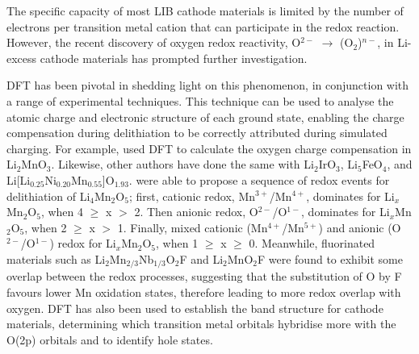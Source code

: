 \documentclass[../main.tex]{subfiles}
\begin{document}
The specific capacity of most LIB cathode materials is limited by the number of electrons per transition metal cation that can participate in the redox reaction. However, the recent discovery of oxygen redox reactivity, O$^{2-}$ $\to$ (O$_2$)$^{n-}$,  in Li-excess cathode materials\cite{Koga2013, Sathiya2013, Oishi2015, Sathiya2015, McCalla2015, Cao2015, Shimoda2016, Chen2016, Luo2016a, Hy2016, Muhammad2016, Seo2016, Gent2017, Zhan2017,  Zheng2017,Assat2018, BenYahia2019, naylor2019depth, Hua2019, House2020, Li2019, Eum2020, Gent2020, Sharpe2020} has prompted further investigation.

DFT has been pivotal in shedding light on this phenomenon, in conjunction with a range of experimental techniques. This technique can be used to analyse the atomic charge and electronic structure of each ground state, enabling the charge compensation during delithiation to be correctly attributed during simulated charging. For example, \citeauthor{Xiao2012} used DFT to calculate the oxygen charge compensation in Li$_2$MnO$_3$.\cite{Xiao2012} Likewise, other authors have done the same with Li$_2$IrO$_3$,\cite{Li2019} Li$_5$FeO$_4$,\cite{Zhan2017} and Li[Li$_{0.25}$Ni$_{0.20}$Mn$_{0.55}$]O$_{1.93}$.\cite{Shimoda2016} \citeauthor{Yao2018} were able to propose a sequence of redox events for delithiation of Li$_4$Mn$_2$O$_5$;\cite{Yao2018} first, cationic redox, Mn$^{3+}$/Mn$^{4+}$, dominates for Li$_x$Mn$_2$O$_5$, when 4 $\geq$ x $>$ 2. Then anionic redox, O$^{2-}$/O$^{1-}$, dominates for Li$_x$Mn$_2$O$_5$, when 2 $\geq$ x $>$ 1. Finally, mixed cationic (Mn$^{4+}$/Mn$^{5+}$) and anionic (O$^{2-}$/O$^{1-}$) redox for Li$_x$Mn$_2$O$_5$, when 1 $\geq$ x $\geq$ 0. Meanwhile, fluorinated materials such as Li$_2$Mn$_{2/3}$Nb$_{1/3}$O$_2$F\cite{Lee2018} and Li$_2$MnO$_2$F\cite{Sharpe2020} were found to exhibit some overlap between the redox processes, suggesting that the substitution of O by F favours lower Mn oxidation states, therefore leading to more redox overlap with oxygen. DFT has also been used to establish the band structure for cathode materials, determining which transition metal orbitals hybridise more with the O(2p) orbitals\cite{Cao2015, Sathiya2013a} and to identify hole states.\cite{Zhan2017, Xiao2012}
\end{document}

